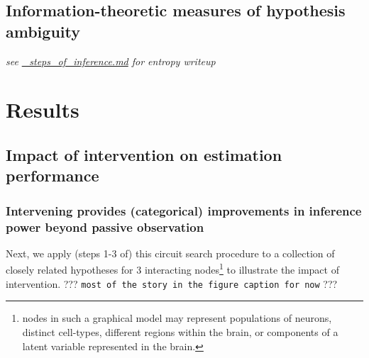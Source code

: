 \hypertarget{information-theoretic-measures-of-hypothesis-ambiguity}{%
\subsection{Information-theoretic measures of hypothesis
ambiguity}\label{information-theoretic-measures-of-hypothesis-ambiguity}}

\emph{see \url{_steps_of_inference.md} for entropy writeup}

\hypertarget{results}{%
\section{Results}\label{results}}

\hypertarget{impact-of-intervention-on-estimation-performance}{%
\subsection{Impact of intervention on estimation
performance}\label{impact-of-intervention-on-estimation-performance}}

\hypertarget{intervening-provides-categorical-improvements-in-inference-power-beyond-passive-observation}{%
\subsubsection{Intervening provides (categorical) improvements in
inference power beyond passive
observation}\label{intervening-provides-categorical-improvements-in-inference-power-beyond-passive-observation}}

Next, we apply (steps 1-3 of) this circuit search procedure to a
collection of closely related hypotheses for 3 interacting
nodes\footnote{nodes in such a graphical model may represent populations
  of neurons, distinct cell-types, different regions within the brain,
  or components of a latent variable represented in the brain.} to
illustrate the impact of intervention. ???
\texttt{most\ of\ the\ story\ in\ the\ figure\ caption\ for\ now} ???

